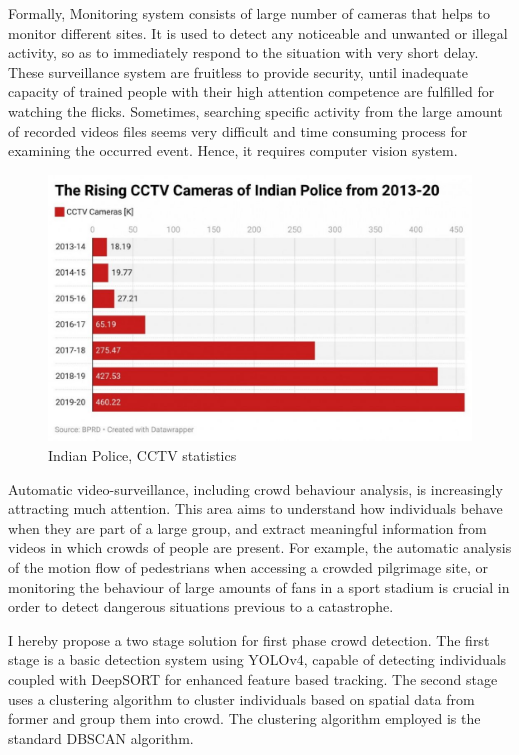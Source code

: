 \documentclass{fisatprojectfinal}
\begin{document}
\par Formally, Monitoring system consists of large number of cameras that helps to monitor different sites. It is used to detect any noticeable and unwanted or illegal activity, so as to immediately respond to the situation with very short delay. These surveillance system are fruitless to provide security, until inadequate capacity of trained people with their high attention competence are fulfilled for watching the flicks. Sometimes, searching specific activity from the large amount of recorded videos files seems very difficult and time consuming process for examining the occurred event. Hence, it requires computer vision system.
\begin{figure}[h!]
\begin{center}
\includegraphics[scale=.45]{img_cctvtrend.eps}
\caption{Indian Police, CCTV statistics}
\end{center}
\end{figure}
\par Automatic video-surveillance, including crowd behaviour analysis, is increasingly attracting much attention. This area aims to understand how individuals behave when they are part of a large group, and extract meaningful information from videos in which crowds of people are present. For example, the automatic analysis of the motion flow of pedestrians when accessing a crowded pilgrimage site, or monitoring the behaviour of large amounts of fans in a sport stadium is crucial in order to detect dangerous situations previous to a catastrophe.
\par I hereby propose a two stage solution for first phase crowd detection. The first stage is a basic detection system using YOLOv4, capable of detecting individuals coupled with DeepSORT for enhanced feature based tracking. The second stage uses a clustering algorithm to cluster individuals based on spatial data from former and group them into crowd. The clustering algorithm employed is the standard DBSCAN algorithm. 
\end{document}
